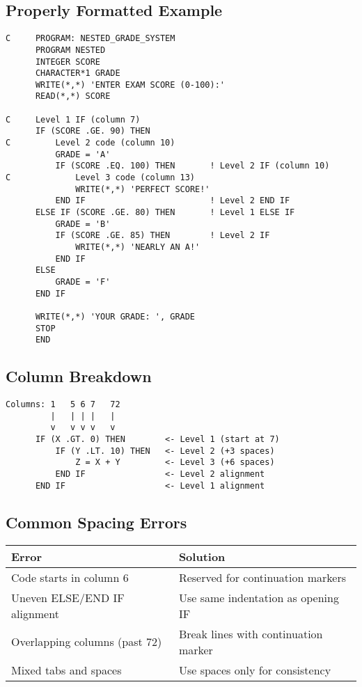 \documentclass{book}
\begin{document}
\subsection*{Properly Formatted Example}
\begin{verbatim}
C     PROGRAM: NESTED_GRADE_SYSTEM
      PROGRAM NESTED
      INTEGER SCORE
      CHARACTER*1 GRADE
      WRITE(*,*) 'ENTER EXAM SCORE (0-100):'
      READ(*,*) SCORE
      
C     Level 1 IF (column 7)
      IF (SCORE .GE. 90) THEN
C         Level 2 code (column 10)
          GRADE = 'A'
          IF (SCORE .EQ. 100) THEN       ! Level 2 IF (column 10)
C             Level 3 code (column 13)
              WRITE(*,*) 'PERFECT SCORE!'
          END IF                         ! Level 2 END IF
      ELSE IF (SCORE .GE. 80) THEN       ! Level 1 ELSE IF
          GRADE = 'B'
          IF (SCORE .GE. 85) THEN        ! Level 2 IF
              WRITE(*,*) 'NEARLY AN A!'
          END IF
      ELSE
          GRADE = 'F'
      END IF
      
      WRITE(*,*) 'YOUR GRADE: ', GRADE
      STOP
      END
\end{verbatim}

\subsection*{Column Breakdown}
\begin{verbatim}
Columns: 1   5 6 7   72
         |   | | |   |
         v   v v v   v
      IF (X .GT. 0) THEN        <- Level 1 (start at 7)
          IF (Y .LT. 10) THEN   <- Level 2 (+3 spaces)
              Z = X + Y         <- Level 3 (+6 spaces)
          END IF                <- Level 2 alignment
      END IF                    <- Level 1 alignment
\end{verbatim}

\subsection*{Common Spacing Errors}
\begin{center}
\begin{tabular}{|p{4cm}|p{8cm}|}
\hline
\textbf{Error} & \textbf{Solution} \\ 
\hline
Code starts in column 6 & Reserved for continuation markers \\
\hline
Uneven ELSE/END IF alignment & Use same indentation as opening IF \\
\hline
Overlapping columns (past 72) & Break lines with continuation marker \\
\hline
Mixed tabs and spaces & Use spaces only for consistency \\
\hline
\end{tabular}
\end{center}
\end{document}
